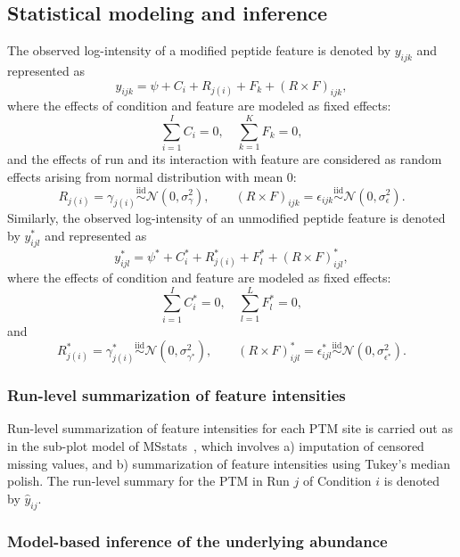 \documentclass{mcp}
\begin{document}
\subsection{Statistical modeling and inference}
\label{sec:model}

The observed log-intensity of a modified peptide feature is denoted by $y_{ijk}$ and represented as
\[
y_{ijk} = \psi + C_{i} + R_{j(i)} + F_{k} + (R \times F)_{ijk},
\]
where the effects of condition and feature are modeled as fixed effects: 
\[
\sum_{i=1}^{I} C_{i} = 0, \quad \sum_{k=1}^{K} F_{k} = 0,
\]
and the effects of run and its interaction with feature are considered as random effects arising from normal distribution with mean $0$: 
\[
R_{j(i)} = \gamma_{j(i)} \stackrel{\text{iid}}{\sim} \mathcal{N}(0, \sigma_{\gamma}^{2}), \qquad
(R \times F)_{ijk} = \epsilon_{ijk} \stackrel{\text{iid}}{\sim} \mathcal{N}(0, \sigma_{\epsilon}^{2}).
\]
Similarly, the observed log-intensity of an unmodified peptide feature is denoted by $y_{ijl}^{\ast}$ and represented as 
\[
y_{ijl}^{\ast} = \psi^{\ast} + C_{i}^{\ast} + R_{j(i)}^{\ast} + F_{l}^{\ast} + (R \times F)_{ijl}^{\ast}, 
\]
where the effects of condition and feature are modeled as fixed effects: 
\[
\sum_{i=1}^{I} C_{i}^{\ast} = 0, \quad \sum_{l=1}^{L} F_{l}^{\ast} = 0,
\]
and 
\[
R_{j(i)}^{\ast} = \gamma_{j(i)}^{\ast} \stackrel{\text{iid}}{\sim} \mathcal{N}(0, \sigma_{\gamma^{\ast}}^{2}), \qquad
(R \times F)_{ijl}^{\ast} = \epsilon_{ijl}^{\ast} \stackrel{\text{iid}}{\sim} \mathcal{N}(0, \sigma_{\epsilon^{\ast}}^{2}).
\]


\subsubsection{Run-level summarization of feature intensities}
\label{sec:sum}

Run-level summarization of feature intensities for each PTM site is carried out as in the sub-plot model of MSstats~\cite{choi_etal_14a}, which involves a) imputation of censored missing values, and b) summarization of feature intensities using Tukey's median polish. The run-level summary for the PTM in Run $j$ of Condition $i$ is denoted by $\hat{y}_{ij}$.


\subsubsection{Model-based inference of the underlying abundance}
\label{sec:infer}
\end{document}
